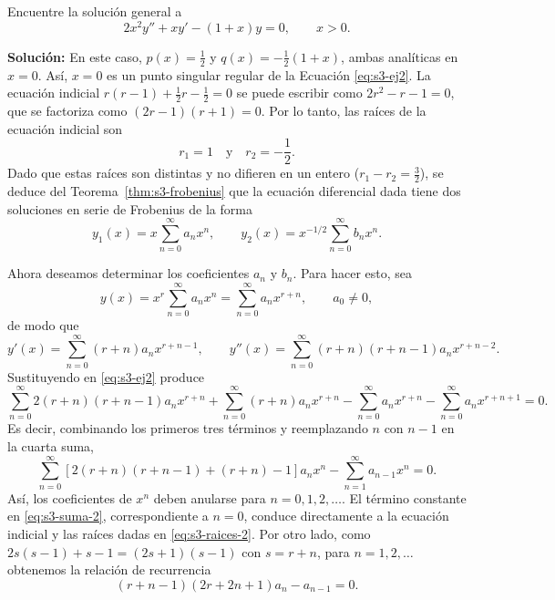 \begin{example}\label{ex:s3-dos}
    Encuentre la solución general a
\begin{equation}
2x^2 y'' + xy' - (1 + x)y = 0, \qquad x > 0.
\label{eq:s3-ej2}
\end{equation}
 
\noindent \textbf{Solución:} \quad En este caso, $p(x) = \frac{1}{2}$ y $q(x) = -\frac{1}{2}(1 + x)$, ambas analíticas en $x = 0$. Así, $x = 0$ es un punto singular regular de la Ecuación \eqref{eq:s3-ej2}. La ecuación indicial $r(r - 1) + \frac{1}{2}r - \frac{1}{2} = 0$ se puede escribir como $2r^2 - r - 1 = 0$, que se factoriza como $(2r - 1)(r + 1) = 0$. Por lo tanto, las raíces de la ecuación indicial son
\begin{equation}
r_1 = 1 \quad \text{y} \quad r_2 = -\frac{1}{2}.
\label{eq:s3-raices-2}
\end{equation}
Dado que estas raíces son distintas y no difieren en un entero ($r_1-r_2=\tfrac32$), se deduce del Teorema~\ref{thm:s3-frobenius} que la ecuación diferencial dada tiene dos soluciones en serie de Frobenius de la forma
\[ y_1(x) = x \sum_{n=0}^{\infty} a_n x^n, \qquad y_2(x) = x^{-1/2} \sum_{n=0}^{\infty} b_n x^n. \]
 
Ahora deseamos determinar los coeficientes $a_n$ y $b_n$. Para hacer esto, sea
\[ y(x) = x^r \sum_{n=0}^{\infty} a_n x^n = \sum_{n=0}^{\infty} a_n x^{r+n}, \qquad a_0 \neq 0, \]
de modo que
\[ y'(x) = \sum_{n=0}^{\infty} (r+n)a_n x^{r+n-1}, \qquad y''(x) = \sum_{n=0}^{\infty} (r+n)(r+n-1)a_n x^{r+n-2}. \]
Sustituyendo en \eqref{eq:s3-ej2} produce
\[ \sum_{n=0}^{\infty} 2(r+n)(r+n-1)a_n x^{r+n} + \sum_{n=0}^{\infty} (r+n)a_n x^{r+n} - \sum_{n=0}^{\infty} a_n x^{r+n} - \sum_{n=0}^{\infty} a_n x^{r+n+1} = 0. \]
Es decir, combinando los primeros tres términos y reemplazando $n$ con $n - 1$ en la cuarta suma,
\begin{equation}
\sum_{n=0}^{\infty} [2(r+n)(r+n-1) + (r+n) - 1]a_n x^n - \sum_{n=1}^{\infty} a_{n-1} x^n = 0.
\label{eq:s3-suma-2}
\end{equation}
Así, los coeficientes de $x^n$ deben anularse para $n = 0, 1, 2, \dots$. El término constante en \eqref{eq:s3-suma-2}, correspondiente a $n = 0$, conduce directamente a la ecuación indicial y las raíces dadas en \eqref{eq:s3-raices-2}. Por otro lado, como $2s(s-1)+s-1=(2s+1)(s-1)$ con $s=r+n$, para $n = 1, 2, \dots$ obtenemos la relación de recurrencia
\begin{equation}
(r+n-1)(2r+2n+1)a_n - a_{n-1} = 0.
\label{eq:s3-rec-2}
\end{equation}
 

\end{example}
